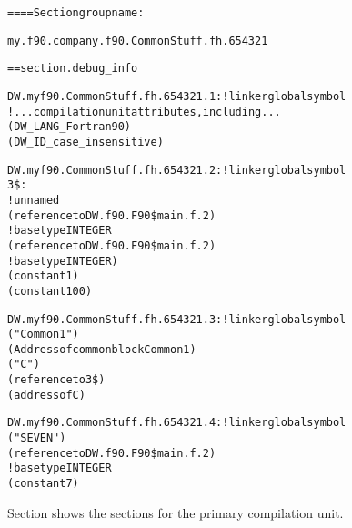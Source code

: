 \begin{alltt}
==== Section group name:

    my.f90.company.f90.CommonStuff.fh.654321

== section .debug\_info

DW.myf90.CommonStuff.fh.654321.1:    ! linker global symbol
        ! ...compilation unit attributes, including...
        (DW\-\_LANG\-\_Fortran90)
        (DW\-\_ID\-\_case\-\_insensitive)

DW.myf90.CommonStuff.fh.654321.2: ! linker global symbol
3\$: 
        ! unnamed
        (reference to DW.f90.F90\$main.f.2)
            ! base type INTEGER
            (reference to DW.f90.F90\$main.f.2)
                ! base type INTEGER)
            (constant 1)
            (constant 100)

DW.myf90.CommonStuff.fh.654321.3: ! linker global symbol
        ("Common1")
        (Address of common block Common1)
            ("C")
            (reference to 3\$)
            (address of C)

DW.myf90.CommonStuff.fh.654321.4: ! linker global symbol
        ("SEVEN")
        (reference to DW.f90.F90\$main.f.2)
            ! base type INTEGER
        (constant 7)
\end{alltt}

Section 
shows the sections for the primary compilation unit.



